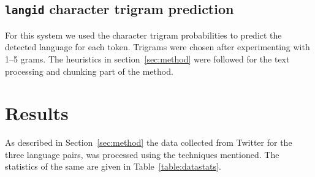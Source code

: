 \documentclass[11pt]{article}
\begin{document}
\subsection{\texttt{langid} character trigram prediction}
\label{langidstuff}


For this system we used the character trigram probabilities to predict the detected language for each token. Trigrams were chosen after experimenting with 1--5 grams. The heuristics in section~\ref{sec:method} were followed for the text processing and chunking part of the method.

\section{Results}
\label{sec:results}
As described in Section~\ref{sec:method} the data collected from Twitter for the three language pairs, was processed using the techniques mentioned. The statistics of the same are given in Table~\ref{table:datastats}. 
\end{document}
